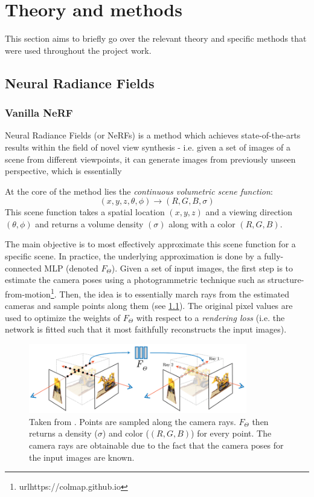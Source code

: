 \chapter{Theory and methods} \label{sec:theory}
\label{chapter:theory}
This section aims to briefly go over the relevant theory and specific methods that were used throughout the project work.

\section{Neural Radiance Fields}
\subsection{Vanilla NeRF}
Neural Radiance Fields\cite{nerf2020} (or NeRFs) is a method which achieves state-of-the-arts results within the field of novel view synthesis - i.e. given a set of images of a scene from different viewpoints, it can generate images from previously unseen perspective, which is essentially  

At the core of the method lies the \textit{continuous volumetric scene function}:
\begin{equation}
    (x,y,z,\theta,\phi) \rightarrow (R,G,B,\sigma)
    \label{eq:scene_function}
\end{equation}
This scene function takes a spatial location $(x,y,z)$ and a viewing direction $(\theta,\phi)$ and returns a volume density $(\sigma)$ along with a color $(R,G,B)$.

The main objective is to most effectively approximate this scene function for a specific scene. In practice, the underlying approximation is done by a fully-connected MLP (denoted $F_\Theta$). Given a set of input images, the first step is to estimate the camera poses using a photogrammetric technique such as structure-from-motion\footnote{url{https://colmap.github.io}}. Then, the idea is to essentially march rays from the estimated cameras and sample points along them (see \ref{fig:nerf_rays}). The original pixel values are used to optimize the weights of $F_\Theta$ with respect to a \textit{rendering loss} (i.e. the network is fitted such that it most faithfully reconstructs the input images).

\begin{figure}[H]
    \centering
    \includegraphics[width=0.85\textwidth]{figures/2_2-nerf-overview.png}
    \caption{Taken from \cite{nerf2020}. Points are sampled along the camera rays. $F_\Theta$ then returns a density ($\sigma$) and color ($(R,G,B)$) for every point. The camera rays are obtainable due to the fact that the camera poses for the input images are known.}
    \label{fig:nerf_rays}
\end{figure}

